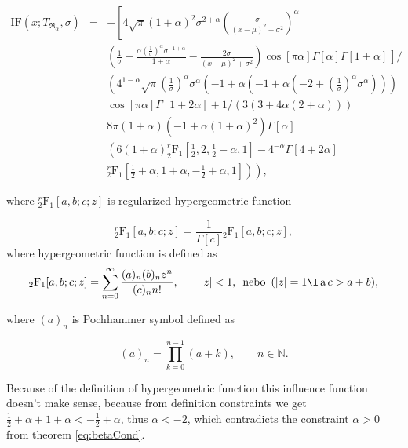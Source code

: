 \begin{eqnarray}
\mathrm{IF}(x;T_{\mathfrak{R}_\alpha},\sigma) &=& -\left[4 \sqrt{\pi } (1+\alpha )^2 \sigma ^{2+\alpha } \left(\frac{\sigma }{(x-\mu )^2+\sigma ^2}\right)^{\alpha} \right. \nonumber\\
&&\left(\frac{1}{\sigma }+\frac{\alpha  \left(\frac{1}{\sigma }\right)^{\alpha } \sigma ^{-1+\alpha }}{1+\alpha }-\frac{2 \sigma }{(x-\mu )^2+\sigma ^2}\right) \left. \cos[\pi  \alpha ] \Gamma[\alpha ] \Gamma[1+\alpha ]  \frac{}{} \right] / \nonumber \\ %
&&\left(4^{1-\alpha } \sqrt{\pi } \left(\frac{1}{\sigma }\right)^{\alpha } \sigma ^{\alpha } \left(-1+\alpha  \left(-1+\alpha  \left(-2+\left(\frac{1}{\sigma }\right)^{\alpha } \sigma ^{\alpha }\right)\right)\right) \right.\nonumber \\ 
&&\left. \cos[\pi  \alpha ] \Gamma[1+2 \alpha ]+1/(3 (3+4 \alpha  (2+\alpha )))\right. \nonumber \\
&& 8 \pi  (1+\alpha ) \left(-1+\alpha  (1+\alpha )^2\right) \Gamma[\alpha ] \nonumber \\
&& \left(6 (1+\alpha ) ^r_2\mathrm{F}_1\left[\frac{1}{2},2,\frac{1}{2}-\alpha ,1\right]-4^{-\alpha } \Gamma[4+2 \alpha ] \right. \nonumber \\
&& \left. \left. ^r_2\mathrm{F}_1\left[\frac{1}{2}+\alpha ,1+\alpha ,-\frac{1}{2}+\alpha ,1\right]\right)\right),
\end{eqnarray}

\noindent where $^r_2\mathrm{F}_1[a,b;c;z]$ is regularized hypergeometric function

\begin{equation}
	^r_2\mathrm{F}_1[a,b;c;z] = {\frac{1}{\Gamma[c]}} {_2\mathrm{F}_1}[a,b;c;z],
\end{equation}
where hypergeometric function is defined as
\begin{equation}
	{_2\mathrm{F}_1}[a,b;c;z]=\sum _{n=0}^{\infty } \frac{(a)_n (b)_n z^n}{ (c)_n n!}, \qquad |z|<1, \, \text{ nebo } \, (|z|=1\l  \,\text{a} \,  c>a+b),
\end{equation}

\noindent where $(a)_n$ is Pochhammer symbol defined as

\begin{equation}
(a)_n=\prod _{k=0}^{n-1} (a+k), \qquad n \in \mathbb{N}.
\end{equation}

\noindent Because of the definition of hypergeometric function this influence function doesn't make sense, because from definition constraints we get $\frac{1}{2}+\alpha  + 1+\alpha < -\frac{1}{2}+\alpha $, thus  $\alpha < -2$, which contradicts the constraint  $\alpha>0$ from theorem \ref{eq:betaCond}. 

